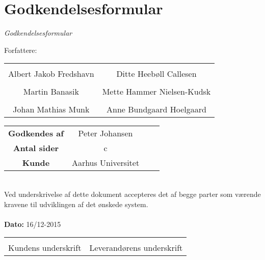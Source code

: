 \chapter{Godkendelsesformular}

{\LARGE\textit{Godkendelsesformular}}

{\large Forfattere:}
\\[5ex]


\begin{tabular}{c c}
\centering 
	\makebox[2.0in]{\hrulefill} & \makebox[2.0in]{\hrulefill}\\
	Albert Jakob Fredshavn & Ditte Heebøll Callesen\\[7ex]
	\makebox[2.0in]{\hrulefill} & \makebox[2.0in]{\hrulefill}\\
	Martin Banasik & Mette Hammer Nielsen-Kudsk\\[7ex]
	\makebox[2.0in]{\hrulefill} & \makebox[2.0in]{\hrulefill}\\
	Johan Mathias Munk & Anne Bundgaard Hoelgaard\\[7ex]
	

\end{tabular}

\begin{tabular}{c c c c}
	\textbf{Godkendes af} & Peter Johansen\\[3ex]
	\textbf{Antal sider} & c \\[3ex]
	\textbf{Kunde} & Aarhus Universitet
\end{tabular}\\[8ex]
Ved underskrivelse af dette dokument accepteres det af begge parter som værende kravene til udviklingen af det ønskede system.
\\
\\
\textbf{Dato: } 16/12-2015\\[7ex]

\begin{tabular}{c c}
	\makebox[2.0in]{\hrulefill} & \makebox[2.0in]{\hrulefill}\\
	\centering 
	Kundens underskrift & Leverandørens underskrift
\end{tabular}
